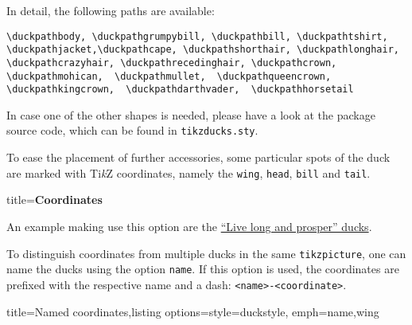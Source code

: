 \documentclass[parskip=half]{scrartcl}
\newcommand{\TikZ}{Ti\emph{k}Z\xspace}
\begin{document}
In detail, the following paths are available:

\begin{lstlisting}[aboveskip=1.2em,breakindent=0pt]
\duckpathbody, \duckpathgrumpybill, \duckpathbill, \duckpathtshirt, \duckpathjacket,\duckpathcape, \duckpathshorthair, \duckpathlonghair, \duckpathcrazyhair, \duckpathrecedinghair, \duckpathcrown,  \duckpathmohican,  \duckpathmullet,  \duckpathqueencrown,  \duckpathkingcrown,  \duckpathdarthvader,  \duckpathhorsetail
\end{lstlisting}
\enlargethispage*{\baselineskip}

In case one of the other shapes is needed, please have a look at the package source code, which can be found in \lstinline|tikzducks.sty|.

To ease the placement of further accessories, some particular spots of the duck are marked with \TikZ coordinates, namely the \lstinline|wing|, \lstinline|head|, \lstinline|bill| and \lstinline|tail|. 

{
\footnotesize\ttfamily
\begin{tcblisting}{title={\normalfont\normalsize\bfseries Coordinates}}
\end{tcblisting}
}
An example making use this option are the \hyperref[starducks]{``Live long and prosper'' ducks}. 

To distinguish coordinates from multiple ducks in the same \lstinline|tikzpicture|, one can name the ducks using the option \lstinline[emph={name}]|name|. If this option is used, the coordinates are prefixed with the respective name and a dash: \lstinline|<name>-<coordinate>|.

\begin{tcblisting}{title={Named coordinates},listing options={style={duckstyle}, emph={name,wing}}}
\end{tcblisting}
\end{document}
